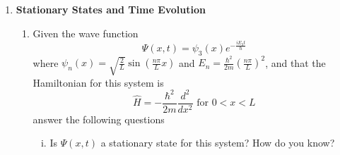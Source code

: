 \documentclass[10pt,letterpaper]{article}
\begin{document}
\begin{enumerate}
\begin{enumerate}[i)]
\item $\braket{p^{2}}$

\color{violet}
The setup for $\braket{p^{2}}$ is $\int_{-\infty}^{\infty} \Psi -\hbar^{2} \frac{\partial^{2} \Psi}{\partial x^{2}}dx$

\begin{gather*}
\braket{p^{2}} = -\pi^{1/16}\hbar^{2}\int_{-\infty}^{\infty} e^{-\frac{x^{2}}{2}} \frac{\partial^{2} e^{-\frac{x^{2}}{2}}}{\partial x^{2}}dx = -\pi^{1/16}\hbar^{2} \left( \int_{-\infty}^{\infty} -e^{-x^{2}}dx + \int_{-\infty}^{\infty} x^{2}e^{-x^{2}}dx \right) = \frac{\pi^{9/16}\hbar^{2}}{4}
\end{gather*}
\color{black}

\item $\sigma_{p}$

\color{violet}
The setup for $\sigma_{p}$ is $\sqrt{\braket{p^{2}} - \braket{p}^{2}}$.
\begin{gather*}
\sigma_{p} = \sqrt{\frac{\pi^{9/16}\hbar^{2}}{4} - 0^{2}} = \frac{\pi^{3/4}\hbar}{2}
\end{gather*}
\color{black}

\item $\sigma_{x}\sigma_{p}$

\color{violet}
\begin{gather*}
\sigma_{x}\sigma_{p} = \frac{\pi^{3/4}}{2} \frac{\pi^{3/4}\hbar}{2} = \frac{\pi^{3/2}\hbar}{4}
\end{gather*}
The minimum amount of amount of deviation is $\frac{\hbar}{2}$. This is almost 1.5 times the minimum. 
\color{black}

\end{enumerate}

\item \textbf{Stationary States and Time Evolution}

\begin{enumerate}
	
\item Given the wave function 
$$\Psi(x, t) = \psi_{3}(x)e^{-\frac{iE_{3}t}{\hbar}}$$
where $\psi_{n}(x) = \sqrt{\frac{2}{L}}\sin(\frac{n\pi}{L}x)$ and $E_{n} = \frac{\hbar^{2}}{2m} \left( \frac{n\pi}{L} \right)^{2}$, and that the Hamiltonian for this system is 
$$\hat{H} = -\frac{\hbar^{2}}{2m} \frac{d^{2}}{dx^{2}} \text{ for } 0 < x < L$$
answer the following questions

\begin{enumerate}[i)]
	
\item Is $\Psi(x, t)$ a stationary state for this system? How do you know?


\end{enumerate}
\end{enumerate}
\end{enumerate}
\end{document}
